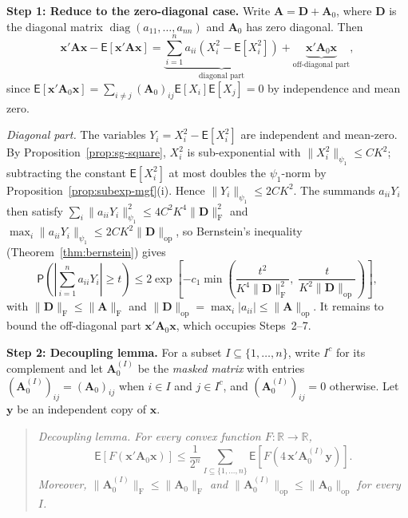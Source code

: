\documentclass[12pt,a4paper]{article}
\makeatletter
\theoremstyle{definition}
\renewenvironment{proof}[1][\proofname]{\par
  \pushQED{\qed}%
  \normalfont \topsep6\p@\@plus6\p@\relax
  \trivlist
  \item[\hskip\labelsep\bfseries #1\@addpunct{.}]\ignorespaces
}{%
  \popQED\endtrivlist\@endpefalse
}
\newcommand\expc{\mathsf{E}}
\newcommand\prb{\mathsf{P}}
\DeclareMathOperator\diag{diag}
\newcommand{\by}{\mathbf{y}}
\newcommand{\bx}{\mathbf{x}}
\newcommand{\bA}{\mathbf{A}}
\newcommand{\bD}{\mathbf{D}}
\newcommand{\Real}{\mathbb{R}}
\newcommand{\opnorm}[1]{\|#1\|_{\mathrm{op}}}
\newcommand{\fnorm}[1]{\|#1\|_{\mathrm{F}}}
\makeatother
\begin{document}
\begin{proof}
\textbf{Step 1: Reduce to the zero-diagonal case.} Write $\bA = \bD + \bA_0$, where $\bD$ is the diagonal matrix $\diag(a_{11}, \ldots, a_{nn})$ and $\bA_0$ has zero diagonal. Then
\[
\bx'\bA\bx - \expc[\bx'\bA\bx] = \underbrace{\sum_{i=1}^n a_{ii}(X_i^2 - \expc[X_i^2])}_{\text{diagonal part}} + \underbrace{\bx'\bA_0\bx}_{\text{off-diagonal part}},
\]
since $\expc[\bx'\bA_0\bx] = \sum_{i \neq j}(\bA_0)_{ij}\expc[X_i]\expc[X_j] = 0$ by independence and mean zero.

\emph{Diagonal part.} The variables $Y_i = X_i^2 - \expc[X_i^2]$ are independent and mean-zero. By Proposition~\ref{prop:sg-square}, $X_i^2$ is sub-exponential with $\|X_i^2\|_{\psi_1} \leqslant C K^2$; subtracting the constant $\expc[X_i^2]$ at most doubles the $\psi_1$-norm by Proposition~\ref{prop:subexp-mgf}(i). Hence $\|Y_i\|_{\psi_1} \leqslant 2C K^2$. The summands $a_{ii}Y_i$ then satisfy $\sum_i \|a_{ii}Y_i\|_{\psi_1}^2 \leqslant 4C^2 K^4\fnorm{\bD}^2$ and $\max_i \|a_{ii}Y_i\|_{\psi_1} \leqslant 2C K^2\opnorm{\bD}$, so Bernstein's inequality (Theorem~\ref{thm:bernstein}) gives
\begin{equation}\label{eq:hw-diagonal}
\prb\!\left(\left|\sum_{i=1}^n a_{ii}Y_i\right| \geqslant t\right) \leqslant 2\exp\!\left[-c_1\min\!\left(\frac{t^2}{K^4\fnorm{\bD}^2},\;\frac{t}{K^2\opnorm{\bD}}\right)\right],
\end{equation}
with $\fnorm{\bD} \leqslant \fnorm{\bA}$ and $\opnorm{\bD} = \max_i|a_{ii}| \leqslant \opnorm{\bA}$. It remains to bound the off-diagonal part $\bx'\bA_0\bx$, which occupies Steps~2--7.

\textbf{Step 2: Decoupling lemma.} For a subset $I \subseteq \{1, \ldots, n\}$, write $I^c$ for its complement and let $\bA_0^{(I)}$ be the \emph{masked matrix} with entries $(\bA_0^{(I)})_{ij} = (\bA_0)_{ij}$ when $i \in I$ and $j \in I^c$, and $(\bA_0^{(I)})_{ij} = 0$ otherwise. Let $\by$ be an independent copy of $\bx$.

\begin{quote}
\emph{Decoupling lemma. For every convex function $F : \Real \to \Real$,}
\begin{equation}\label{eq:hw-decoupling}
\expc[F(\bx'\bA_0\bx)] \leqslant \frac{1}{2^n}\sum_{I \subseteq \{1,\ldots,n\}} \expc\!\left[F\!\left(4\,\bx'\bA_0^{(I)}\by\right)\right].
\end{equation}
\emph{Moreover, $\fnorm{\bA_0^{(I)}} \leqslant \fnorm{\bA_0}$ and $\opnorm{\bA_0^{(I)}} \leqslant \opnorm{\bA_0}$ for every $I$.}
\end{quote}


\end{proof}
\end{document}
